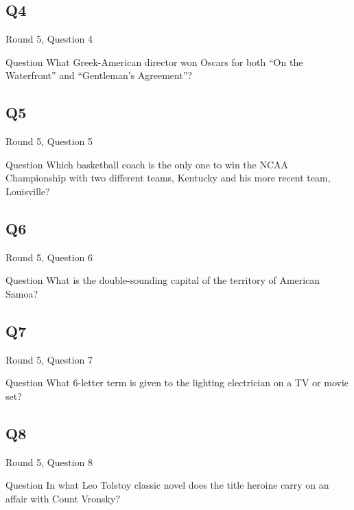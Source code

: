 \documentclass[11pt]{beamer}
\begin{document}
\subsection*{Q4}
\begin{frame}[t]{Round 5, Question 4}
\vspace{2em}
\begin{block}{Question}
What Greek-American director won Oscars for both ``On the Waterfront'' and ``Gentleman's Agreement''\@?
\end{block}
\end{frame}
    

\subsection*{Q5}
\begin{frame}[t]{Round 5, Question 5}
\vspace{2em}
\begin{block}{Question}
Which basketball coach is the only one to win the NCAA Championship with two different teams, Kentucky and his more recent team, Louisville\@?
\end{block}
\end{frame}
    

\subsection*{Q6}
\begin{frame}[t]{Round 5, Question 6}
\vspace{2em}
\begin{block}{Question}
What is the double-sounding capital of the territory of American Samoa\@?
\end{block}
\end{frame}
    

\subsection*{Q7}
\begin{frame}[t]{Round 5, Question 7}
\vspace{2em}
\begin{block}{Question}
What 6-letter term is given to the lighting electrician on a TV or movie set\@?
\end{block}
\end{frame}
    

\subsection*{Q8}
\begin{frame}[t]{Round 5, Question 8}
\vspace{2em}
\begin{block}{Question}
In what Leo Tolstoy classic novel does the title heroine carry on an affair with Count Vronsky\@?
\end{block}
\end{frame}
    
\end{document}
